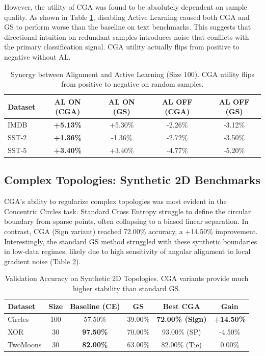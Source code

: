\documentclass[sigconf,anonymous]{aamas}
\begin{document}
However, the utility of CGA was found to be absolutely dependent on sample quality. As shown in Table \ref{tab:al_synergy}, disabling Active Learning caused both CGA and GS to perform worse than the baseline on text benchmarks. This suggests that directional intuition on redundant samples introduces noise that conflicts with the primary classification signal. CGA utility actually flips from positive to negative without AL.

\begin{table}[h]
\centering
\caption{Synergy between Alignment and Active Learning (Size 100). CGA utility flips from positive to negative on random samples.}
\label{tab:al_synergy}
\begin{tabular}{lcccc}
\toprule
\textbf{Dataset} & \textbf{AL ON (CGA)} & \textbf{AL ON (GS)} & \textbf{AL OFF (CGA)} & \textbf{AL OFF (GS)} \\ \midrule
IMDB & \textbf{+5.13\%} & +5.30\% & -2.26\% & -3.12\%
 \\
SST-2 & \textbf{+1.36\%} & -1.36\% & -2.72\% & -3.50\%
 \\
SST-5 & \textbf{+3.40\%} & +3.40\% & -4.77\% & -5.20\%
 \bottomrule
\end{tabular}
\end{table}

\subsection{Complex Topologies: Synthetic 2D Benchmarks}
CGA's ability to regularize complex topologies was most evident in the Concentric Circles task. Standard Cross Entropy struggle to define the circular boundary from sparse points, often collapsing to a biased linear separation. In contrast, CGA (Sign variant) reached 72.00\% accuracy, a +14.50\% improvement. Interestingly, the standard GS method struggled with these synthetic boundaries in low-data regimes, likely due to high sensitivity of angular alignment to local gradient noise (Table \ref{tab:2d_results}).

\begin{table}[h]
\centering
\caption{Validation Accuracy on Synthetic 2D Topologies. CGA variants provide much higher stability than standard GS.}
\label{tab:2d_results}
\begin{tabular}{@{}lccccc@{}}
\toprule
\textbf{Dataset} & \textbf{Size} & \textbf{Baseline (CE)} & \textbf{GS \cite{teney2020learning}} & \textbf{Best CGA} & \textbf{Gain} \\ \midrule
Circles & 100 & 57.50\% & 39.00\% & \textbf{72.00\% (Sign)} & \textbf{+14.50\%}
 \\
XOR     & 30 & \textbf{97.50\%} & 70.00\% & 93.00\% (SP) & -4.50\%
 \\
TwoMoons & 30 & \textbf{82.00\%} & 63.00\% & 82.00\% (Tie) & 0.00\%
 \bottomrule
\end{tabular}
\end{table}
\end{document}
